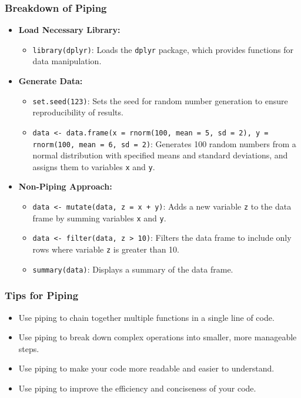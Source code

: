 \documentclass[serif, 9pt, aspectratio=32]{beamer}
\begin{document}
\begin{frame}
    \frametitle{Breakdown of Piping}
    \begin{itemize}
        \setlength{\itemsep}{2em}
        \item \textbf{Load Necessary Library:}
              \begin{itemize}
                  \item \texttt{library(dplyr)}: Loads the \texttt{dplyr} package, which provides functions for data manipulation.
              \end{itemize}

        \item \textbf{Generate Data:}
              \begin{itemize}
                  \item \texttt{set.seed(123)}: Sets the seed for random number generation to ensure reproducibility of results.
                  \item \texttt{data <- data.frame(x = rnorm(100, mean = 5, sd = 2), y = rnorm(100, mean = 6, sd = 2)}: Generates 100 random numbers from a normal distribution with specified means and standard deviations, and assigns them to variables \texttt{x} and \texttt{y}.
              \end{itemize}

        \item \textbf{Non-Piping Approach:}
              \begin{itemize}
                  \item \texttt{data <- mutate(data, z = x + y)}: Adds a new variable \texttt{z} to the data frame by summing variables \texttt{x} and \texttt{y}.
                  \item \texttt{data <- filter(data, z > 10)}: Filters the data frame to include only rows where variable \texttt{z} is greater than 10.
                  \item \texttt{summary(data)}: Displays a summary of the data frame.
              \end{itemize}
    \end{itemize}
\end{frame}

\begin{frame}
    \frametitle{Tips for Piping}
    \begin{itemize}
        \setlength{\itemsep}{2em}
        \item Use piping to chain together multiple functions in a single line of code.
        \item Use piping to break down complex operations into smaller, more manageable steps.
        \item Use piping to make your code more readable and easier to understand.
        \item Use piping to improve the efficiency and conciseness of your code.
    \end{itemize}
\end{frame}
\end{document}
